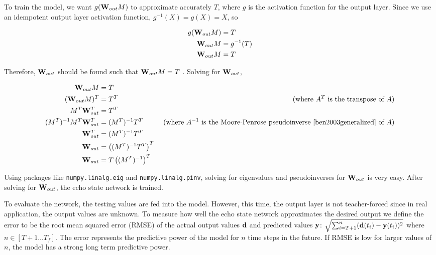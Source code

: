 \documentclass{article}
\begin{document}
To train the model, we want $g(\mathbf{W}_{out} M)$ to approximate accurately 
$T$, where $g$ is the activation function for the output layer.
Since we use an
idempotent output layer activation function, $g^{-1}(X) = g(X) = X$, so

\begin{align*}
    g(\mathbf{W}_{out} M) &= T \\
    \mathbf{W}_{out} M &= g^{-1}(T) \\
    \mathbf{W}_{out} M &= T
\end{align*}

Therefore, $\mathbf{W}_{out}$ should be found such that $\mathbf{W}_{out} M = T$
\cite{jaeger2002tutorial}. Solving for $\mathbf{W}_{out}$,

\begin{align*}
    \mathbf{W}_{out} M &= T \\
    (\mathbf{W}_{out} M)^T &= T^T & \text{ (where $A^T$ is the transpose of $A$)} \\
    M^T \mathbf{W}_{out}^T &= T^T \\
    (M^T)^{-1} M^T \mathbf{W}_{out}^T &= (M^T)^{-1} T^T & \text{ (where $A^{-1}$ is the Moore-Penrose pseudoinverse \cite{ben2003generalized} of $A$)} \\
    \mathbf{W}_{out}^T &= (M^T)^{-1} T^T \\
    \mathbf{W}_{out} &= \left((M^T)^{-1} T^T\right)^T \\
    \mathbf{W}_{out} &= T \left((M^T)^{-1}\right)^T
\end{align*}

Using packages like \texttt{numpy.linalg.eig} and \texttt{numpy.linalg.pinv},
solving for eigenvalues and pseudoinverses for $\mathbf{W}_{out}$ is very easy. After
solving for $\mathbf{W}_{out}$, the echo state network is trained.

To evaluate the network, the testing values are fed into the model. However,
this time, the output layer is not teacher-forced since in real application,
the output values are unknown. To measure how well the echo state network
approximates the desired output we define the error to be the root mean
squared error (RMSE) of the actual output values $\mathbf{d}$ and predicted values
$\mathbf{y}$: $\sqrt{\sum_{i=T+1}^{n} (\mathbf{d}(t_i) - \mathbf{y}(t_i))^2}$ where $n \in [T+1
\dots T_f]$. The error represents the predictive power of the model for $n$
time steps in the future. If RMSE is low for larger values of $n$, the model
has a strong long term predictive power.


\end{document}

